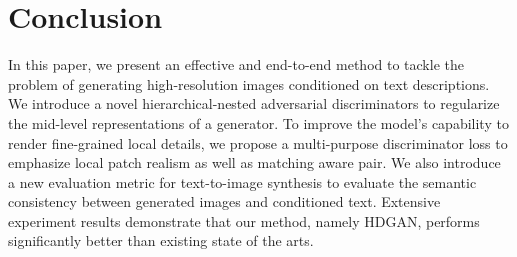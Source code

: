 \documentclass[10pt,twocolumn,letterpaper]{article}
\begin{document}
\section{Conclusion}
In this paper, we present an effective and end-to-end method to tackle the problem of generating high-resolution images conditioned on text descriptions. We introduce a novel hierarchical-nested adversarial discriminators to regularize the mid-level representations of a generator. To improve the model's capability to render fine-grained local details, we propose a multi-purpose discriminator loss to emphasize local patch realism as well as matching aware pair. We also introduce a new evaluation metric for text-to-image synthesis to evaluate the semantic consistency between generated images and conditioned text.
Extensive experiment results demonstrate that our method, namely HDGAN, performs significantly better than existing state of the arts.


{\small


}
\end{document}
